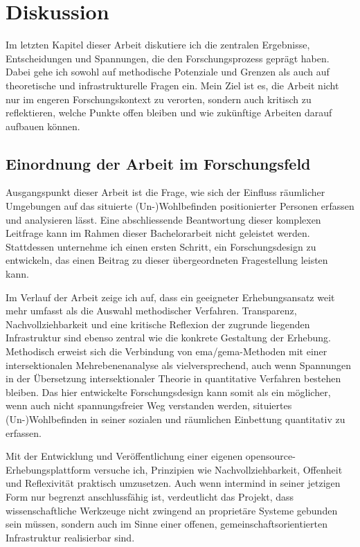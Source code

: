 \chapter{Diskussion} \label{sec:diskussion}

Im letzten Kapitel dieser Arbeit diskutiere ich die zentralen Ergebnisse, Entscheidungen und Spannungen, die den Forschungsprozess geprägt haben. Dabei gehe ich sowohl auf methodische Potenziale und Grenzen als auch auf theoretische und infrastrukturelle Fragen ein. Mein Ziel ist es, die Arbeit nicht nur im engeren Forschungskontext zu verorten, sondern auch kritisch zu reflektieren, welche Punkte offen bleiben und wie zukünftige Arbeiten darauf aufbauen können.

\section{Einordnung der Arbeit im Forschungsfeld}

Ausgangspunkt dieser Arbeit ist die Frage, wie sich der Einfluss räumlicher Umgebungen auf das situierte (Un-)Wohlbefinden  positionierter Personen erfassen und analysieren lässt. Eine abschliessende Beantwortung dieser komplexen Leitfrage kann im Rahmen dieser Bachelorarbeit nicht geleistet werden. Stattdessen unternehme ich einen ersten Schritt, ein Forschungsdesign zu entwickeln, das einen Beitrag zu dieser übergeordneten Fragestellung leisten kann.

Im Verlauf der Arbeit zeige ich auf, dass ein geeigneter Erhebungsansatz weit mehr umfasst als die Auswahl methodischer Verfahren. Transparenz, Nachvollziehbarkeit und eine kritische Reflexion der zugrunde liegenden Infrastruktur sind ebenso zentral wie die konkrete Gestaltung der Erhebung. Methodisch erweist sich die Verbindung von \gls{ema}/\gls{gema}-Methoden mit einer intersektionalen Mehrebenenanalyse als vielversprechend, auch wenn Spannungen in der Übersetzung intersektionaler Theorie in quantitative Verfahren bestehen bleiben. Das hier entwickelte Forschungsdesign kann somit als ein möglicher, wenn auch nicht spannungsfreier Weg verstanden werden, situiertes (Un-)Wohlbefinden in seiner sozialen und räumlichen Einbettung quantitativ zu erfassen.

Mit der Entwicklung und Veröffentlichung einer eigenen \gls{opensource}-Erhebungsplattform versuche ich, Prinzipien wie Nachvollziehbarkeit, Offenheit und Reflexivität praktisch umzusetzen. Auch wenn \gls{intermind} in seiner jetzigen Form nur begrenzt anschlussfähig ist, verdeutlicht das Projekt, dass wissenschaftliche Werkzeuge nicht zwingend an proprietäre Systeme gebunden sein müssen, sondern auch im Sinne einer offenen, gemeinschaftsorientierten Infrastruktur realisierbar sind.

